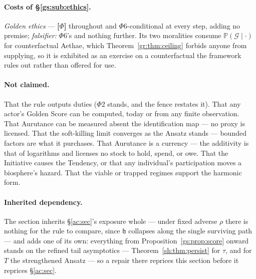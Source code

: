 \documentclass[11pt]{article}
\numberwithin{equation}{section}
\theoremstyle{plain}
\theoremstyle{definition}
\theoremstyle{remark}
\newcommand{\PP}{\mathbb{P}}
\newcommand{\hm}{\mathfrak{h}}
\begin{document}
\paragraph{Costs of \S\ref{gs:sub:ethics}.} \emph{Golden ethics} ---
\textbf{[$\Phi$]} throughout and $\Phi6$-conditional at every step, adding
no premise; \emph{falsifier:} $\Phi6$'s and nothing further. Its two
moralities consume $\PP(\mathcal G\mid\cdot)$ for counterfactual Aethae,
which Theorem~\ref{gr:thm:ceiling} forbids anyone from supplying, so it is
exhibited as an exercise on a counterfactual the framework rules out rather
than offered for use.

\paragraph{Not claimed.} That the rule outputs duties ($\Phi2$ stands, and the fence restates it). That any actor's Golden Score can be computed, today or from any finite observation. That Aurutance can be measured absent the identification map --- no proxy is licensed. That the soft-killing limit converges as the Ansatz stands --- bounded factors are what it purchases. That Aurutance is a currency --- the additivity is that of logarithms and licenses no stock to hold, spend, or owe. That the Initiative causes the Tendency, or that any individual's participation moves a biosphere's hazard. That the viable or trapped regimes support the harmonic form.

\paragraph{Inherited dependency.} The section inherits \S\ref{ac:sec}'s exposure whole --- under fixed adverse $\rho$ there is nothing for the rule to compare, since $\hm$ collapses along the single surviving path --- and adds one of its own: everything from Proposition~\ref{gs:prop:score} onward stands on the refined tail asymptotics --- Theorem~\ref{sh:thm:persist} for $\tau$, and for $T$ the strengthened Ansatz --- so a repair there reprices this section before it reprices \S\ref{ac:sec}.
\end{document}
